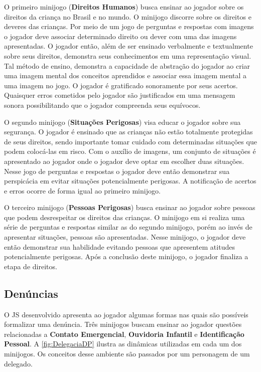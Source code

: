 O primeiro minijogo (\textbf{Direitos Humanos}) busca ensinar ao jogador sobre os direitos da criança no Brasil e no mundo. O minijogo discorre sobre os direitos e deveres das crianças. Por meio de um jogo de perguntas e respostas com imagens o jogador deve associar determinado direito ou dever com uma das imagens apresentadas. O jogador então, além de ser ensinado verbalmente e textualmente sobre seus direitos, demonstra seus conhecimentos em uma representação visual. Tal método de ensino, demonstra a capacidade de abstração do jogador ao criar uma imagem mental dos conceitos aprendidos e associar essa imagem mental a uma imagem no jogo. O jogador é gratificado sonoramente por seus acertos. Quaisquer erros cometidos pelo jogador são justificados em uma mensagem sonora possibilitando que o jogador compreenda seus equívocos. 

O segundo minijogo (\textbf{Situações Perigosas}) visa educar o jogador sobre sua segurança. O jogador é ensinado que as crianças não estão totalmente protegidas de seus direitos, sendo importante tomar cuidado com determinadas situações que podem colocá-las em risco. %
Com o auxílio de imagens, um conjunto de situações é apresentado ao jogador onde o jogador deve optar em escolher duas situações. Nesse jogo de perguntas e respostas o jogador deve então demonstrar sua perspicácia em evitar situações potencialmente perigosas. A notificação de acertos e erros ocorre de forma igual ao primeiro minijogo.

O terceiro minijogo (\textbf{Pessoas Perigosas}) busca ensinar ao jogador sobre pessoas que podem desrespeitar os direitos das crianças. O minijogo em si realiza uma série de perguntas e respostas similar as do segundo minijogo, porém ao invés de apresentar situações, pessoas são apresentadas. Nesse minijogo, o jogador deve então demonstrar sua habilidade evitando pessoas que apresentem atitudes potencialmente perigosas. Após a conclusão deste minijogo, o jogador finaliza a etapa de direitos. 


\subsection{Denúncias}\label{subsec:3}

O \ac{JS} desenvolvido apresenta ao jogador algumas formas nas quais são possíveis formalizar uma denúncia. Três minijogos buscam ensinar ao jogador questões relacionadas a \textbf{Contato Emergencial}, \textbf{Ouvidoria Infantil} e \textbf{Identificação Pessoal}. A \autoref{fig:DelegaciaDP} ilustra as dinâmicas utilizadas em cada um dos minijogos. Os conceitos desse ambiente são passados por um personagem de um delegado. 

